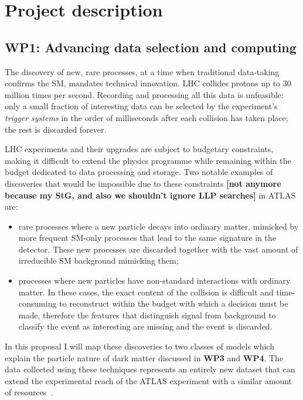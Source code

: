 \documentclass[11pt,a4paper]{article}
\begin{document}
\section{Project description}
\smallskip

\subsection*{WP1: Advancing data selection and computing}

The discovery of new, rare processes, at a time when traditional data-taking confirms the SM, mandates technical innovation. LHC collides protons up to 30 million times per second. Recording and processing all this data is unfeasible: only a small fraction of interesting data can be selected by the experiment’s \textit{trigger systems} in the order of milliseconds after each collision has taken place; the rest is discarded forever.

LHC experiments and their upgrades are subject to budgetary constraints, making it difficult to extend the physics programme while remaining within the budget dedicated to data processing and storage. 
Two notable examples of discoveries that would be impossible due to these constraints \textbf{[not anymore because my StG, and also we shouldn’t ignore LLP searches]} in ATLAS are:
\begin{itemize} 
\item rare processes where a new particle decays into ordinary matter, mimicked by more frequent SM-only processes that lead to the same signature in the detector. These new processes are discarded together with the vast amount of irreducible SM background mimicking them;
\item processes where new particles have non-standard interactions with ordinary matter. In these cases, the exact content of the collision is difficult and time-consuming to reconstruct within the budget with which a decision must be made, therefore the features that distinguish signal from background to classify the event as interesting are missing and the event is discarded.
\end{itemize}
In this proposal I will map these discoveries to two classes of models which explain the particle nature of dark matter discussed in \textbf{WP3} and \textbf{WP4}. The data collected using these techniques represents an entirely new dataset that can extend the experimental reach of the ATLAS experiment with a similar amount of resources~\cite{Resonances}. 
\end{document}

